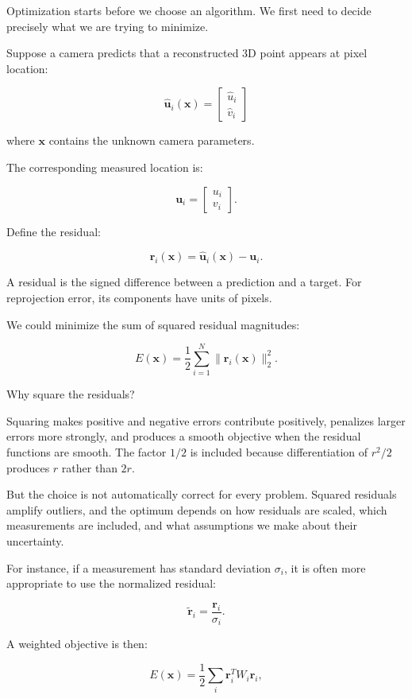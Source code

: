 Optimization starts before we choose an algorithm. We first need to decide precisely what we are trying to minimize.

Suppose a camera predicts that a reconstructed 3D point appears at pixel location:

\[
\hat{\mathbf u}_i(\mathbf x)= \begin{bmatrix}\hat u_i\\\hat v_i\end{bmatrix}
\]

where \(\mathbf x\) contains the unknown camera parameters.

The corresponding measured location is:

\[
\mathbf u_i= \begin{bmatrix}u_i\\v_i\end{bmatrix}.
\]

Define the residual:

\[
\boxed{ \mathbf r_i(\mathbf x) = \hat{\mathbf u}_i(\mathbf x)-\mathbf u_i }.
\]

A residual is the signed difference between a prediction and a target. For reprojection error, its components have units of pixels.

We could minimize the sum of squared residual magnitudes:

\[
\boxed{ E(\mathbf x)= \frac12\sum_{i=1}^{N} \|\mathbf r_i(\mathbf x)\|_2^2 }.
\]

Why square the residuals?

Squaring makes positive and negative errors contribute positively, penalizes larger errors more strongly, and produces a smooth objective when the residual functions are smooth. The factor \(1/2\) is included because differentiation of \(r^2/2\) produces \(r\) rather than \(2r\).

But the choice is not automatically correct for every problem. Squared residuals amplify outliers, and the optimum depends on how residuals are scaled, which measurements are included, and what assumptions we make about their uncertainty.

For instance, if a measurement has standard deviation \(\sigma_i\), it is often more appropriate to use the normalized residual:

\[
\tilde{\mathbf r}_i= \frac{\mathbf r_i}{\sigma_i}.
\]

A weighted objective is then:

\[
E(\mathbf x)= \frac12\sum_i \mathbf r_i^TW_i\mathbf r_i,
\]

